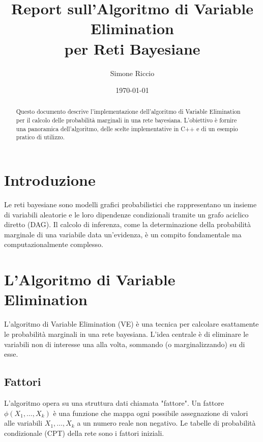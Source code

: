 \documentclass[a4paper, 11pt]{article}
\title{Report sull'Algoritmo di Variable Elimination\\per Reti Bayesiane}
\author{Simone Riccio}
\date{\today}
\begin{document}
\maketitle

\begin{abstract}
Questo documento descrive l'implementazione dell'algoritmo di Variable Elimination per il calcolo delle probabilità marginali in una rete bayesiana. L'obiettivo è fornire una panoramica dell'algoritmo, delle scelte implementative in C++ e di un esempio pratico di utilizzo.
\end{abstract}

\tableofcontents
\newpage

\section{Introduzione}
Le reti bayesiane sono modelli grafici probabilistici che rappresentano un insieme di variabili aleatorie e le loro dipendenze condizionali tramite un grafo aciclico diretto (DAG). Il calcolo di inferenza, come la determinazione della probabilità marginale di una variabile data un'evidenza, è un compito fondamentale ma computazionalmente complesso.

\section{L'Algoritmo di Variable Elimination}
L'algoritmo di Variable Elimination (VE) è una tecnica per calcolare esattamente le probabilità marginali in una rete bayesiana. L'idea centrale è di eliminare le variabili non di interesse una alla volta, sommando (o marginalizzando) su di esse.

\subsection{Fattori}
L'algoritmo opera su una struttura dati chiamata "fattore". Un fattore $\phi(X_1, \dots, X_k)$ è una funzione che mappa ogni possibile assegnazione di valori alle variabili $X_1, \dots, X_k$ a un numero reale non negativo. Le tabelle di probabilità condizionale (CPT) della rete sono i fattori iniziali.
\end{document}
